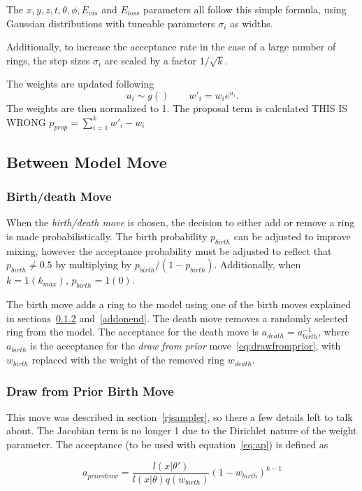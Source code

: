 \documentclass[11pt]{article} %
\begin{document}
The $x,y,z,t,\theta,\phi,E_{vis}$ and $E_{loss}$ parameters all follow this simple formula, using Gaussian distributions with tuneable parameters $\sigma_{i}$ as widths.

Additionally, to increase the acceptance rate in the case of a large number of rings, the step sizes $\sigma_{i}$ are scaled by a factor $1/\sqrt{k}$.

The weights are updated following 
\begin{equation}
u_{i}\sim g()\qquad w'_{i} = w_{i}e^{u_{i}}.
\end{equation}
The weights are then normalized to 1. The proposal term is calculated THIS IS WRONG $p_{prop}=\sum^{k}_{i=1}w'_{i}-w_{i}$

\subsection{Between Model Move}
\subsubsection{Birth/death Move}
When the \emph{birth/death move} is chosen, the decision to either add or remove a ring is made probabilistically. The birth probability $p_{birth}$ can be adjusted to improve mixing, however the acceptance probability must be adjusted to reflect that $p_{birth}\neq 0.5$ by multiplying by $p_{birth} / (1 - p_{birth})$. Additionally, when $k=1 (k_{max})$, $p_{birth} = 1 (0)$. 


The birth move adds a ring to the model using one of the birth moves explained in sections~\ref{drawfromprior} and~\ref{addonend}.
The death move removes a randomly selected ring from the model. The acceptance for the death move is $a_{death} = a_{birth}^{-1}$, where $a_{birth}$ is the acceptance for the \emph{draw from prior} move~\ref{eq:drawfromprior}, with $w_{birth}$ replaced with the weight of the removed ring $w_{death}$.

\subsubsection{Draw from Prior Birth Move}\label{drawfromprior}
This move was described in section~\ref{rjsampler}, so there a few details left to talk about. The Jacobian term is no longer 1 due to the Dirichlet nature of the weight parameter. The acceptance (to be used with equation~\ref{eq:ap}) is defined as

\begin{equation}\label{eq:drawfromprior}
a_{prior draw} = \frac{l(x|\theta')} {l(x|\theta)q(w_{birth})}(1-w_{birth})^{k-1}
\end{equation}
\end{document}
